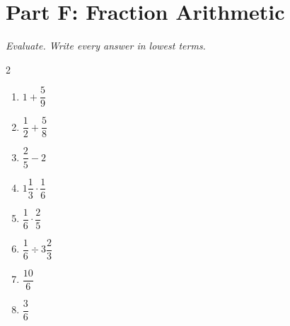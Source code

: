 \documentclass[11pt]{article}
\begin{document}
\section*{Part F: Fraction Arithmetic}
\noindent\textit{Evaluate. Write every answer in lowest terms.}
\begin{multicols}{2}
\begin{enumerate}
  \item $1 + \dfrac{5}{9}$
  \vspace{1.4cm}
  \item $\dfrac{1}{2} + \dfrac{5}{8}$
  \vspace{1.4cm}
  \item $\dfrac{2}{5} - 2$
  \vspace{1.4cm}
  \item $1\dfrac{1}{3} \cdot \dfrac{1}{6}$
  \vspace{1.4cm}
  \item $\dfrac{1}{6} \cdot \dfrac{2}{5}$
  \vspace{1.4cm}
  \item $\dfrac{1}{6} \div 3\dfrac{2}{3}$
  \vspace{1.4cm}
  \item $\dfrac{10}{6}$
  \vspace{1.4cm}
  \item $\dfrac{3}{6}$
  \vspace{1.4cm}
\end{enumerate}
\end{multicols}
\end{document}
